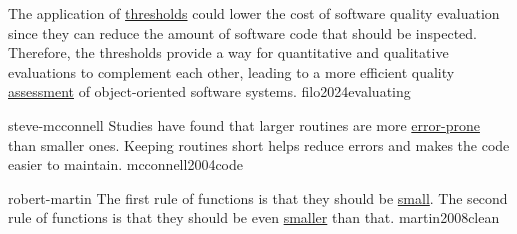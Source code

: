 \documentclass{article}
\begin{document}
  {The application of \ul{thresholds} could lower the cost of software quality evaluation since they can reduce the amount of software code that should be inspected. Therefore, the thresholds provide a way for quantitative and qualitative evaluations to complement each other, leading to a more efficient quality \ul{assessment} of object-oriented software systems.}
  {filo2024evaluating}



\qte
  {steve-mcconnell}
  {Studies have found that larger routines are more \ul{error-prone} than smaller ones. Keeping routines short helps reduce errors and makes the code easier to maintain.}
  {mcconnell2004code}

\qte
  {robert-martin}
  {The first rule of functions is that they should be \ul{small}. The second rule of functions is that they should be even \ul{smaller} than that.}
  {martin2008clean}

\end{document}
